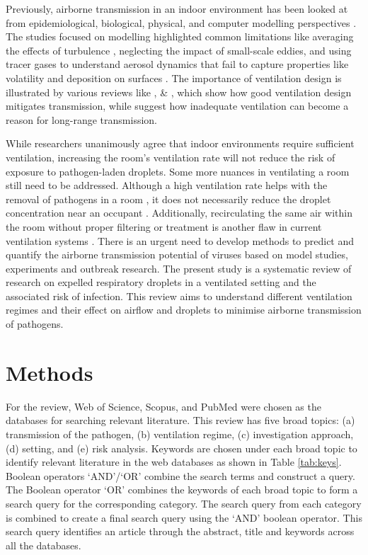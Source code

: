 \documentclass[a4paper,12pt]{elsarticle}
\begin{document}
Previously, airborne transmission in an indoor environment has been looked at from epidemiological, biological, physical, and computer modelling perspectives \cite{argyropoulos2023airborne}. The studies focused on modelling highlighted common limitations like averaging the effects of turbulence \cite{mirzaie2021covid,dbouk2020respiratory},  neglecting the impact of small-scale eddies, and using tracer gases to understand aerosol dynamics that fail to capture properties like volatility and deposition on surfaces \cite{rayegan2022review, zhao2022airborne}. The importance of ventilation design is illustrated by various reviews like \cite{luongo2016role}, \cite{hobeika2023assessing} \& \cite{thornton2022impact}, which show how good ventilation design mitigates transmission, while \citet{correia2020airborne} suggest how inadequate ventilation can become a reason for long-range transmission.

While researchers unanimously agree that indoor environments require sufficient ventilation, increasing the room's ventilation rate will not reduce the risk of exposure to pathogen-laden droplets. Some more nuances in ventilating a room still need to be addressed. Although a high ventilation rate helps with the removal of pathogens in a room \cite{guo2022visualization, ho2021modeling}, it does not necessarily reduce the droplet concentration near an occupant \cite{arpino2023cfd}. Additionally, recirculating the same air within the room without proper filtering or treatment is another flaw in current ventilation systems \cite{li2021probable}. There is an urgent need to develop methods to predict and quantify the airborne transmission potential of viruses based on model studies, experiments and outbreak research. The present study is a systematic review of research on expelled respiratory droplets in a ventilated setting and the associated risk of infection. This review aims to understand different ventilation regimes and their effect on airflow and droplets to minimise airborne transmission of pathogens.

\section{Methods}

For the review, Web of Science, Scopus, and PubMed were chosen as the databases for searching relevant literature. This review has five broad topics: (a) transmission of the pathogen, (b) ventilation regime, (c) investigation approach, (d) setting, and (e) risk analysis. Keywords are chosen under each broad topic to identify relevant literature in the web databases as shown in Table \ref{tab:keys}. Boolean operators `AND'/`OR' combine the search terms and construct a query. The Boolean operator `OR' combines the keywords of each broad topic to form a search query for the corresponding category. The search query from each category is combined to create a final search query using the `AND' boolean operator. This search query identifies an article through the abstract, title and keywords across all the databases.
\end{document}
